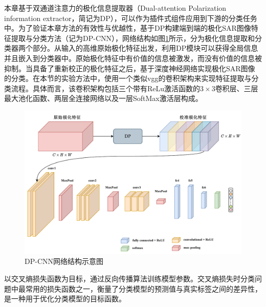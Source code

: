 
本章基于双通道注意力的极化信息提取器（Dual-attention Polarization information extractor，简记为DP），可以作为插件式组件应用到下游的分类任务中。为了验证本章方法的有效性与优越性，基于DP构建端到端的极化SAR图像特征提取与分类方法（记为DP-CNN），网络结构如图\ref{fig:DPCNN}所示，分为极化信息提取和分类器两个部分。从输入的高维原始极化特征出发，利用DP模块可以获得全局信息并且嵌入到分类器中。原始极化特征中有价值的信息被激发，而没有价值的信息被抑制。当具备了重新校正的极化特征之后，基于深度神经网络实现极化SAR图像的分类。在本节的实验方法中，使用一个类似vgg的卷积架构来实现特征提取与分类流程。具体而言，该卷积架构包括三个带有ReLu激活函数的$3\times 3$卷积层、三层最大池化函数、两层全连接网络以及一层SoftMax激活层构成。

\begin{figure}[ht!]
    \centering
    \includegraphics[width=14cm]{pic/chapter3/DPCNN.pdf}
    \caption{DP-CNN网络结构示意图}
    \label{fig:DPCNN}
\end{figure}


以交叉熵损失函数\citing{}为目标，通过反向传播算法训练模型参数。交叉熵损失时分类问题中最常用的损失函数之一，衡量了分类模型的预测值与真实标签之间的差异性，是一种用于优化分类模型的目标函数。

